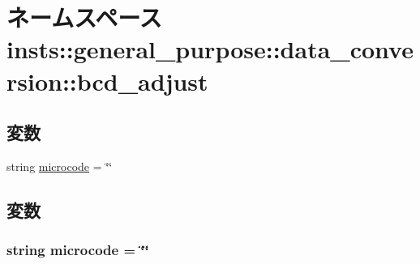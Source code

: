 \hypertarget{namespaceinsts_1_1general__purpose_1_1data__conversion_1_1bcd__adjust}{
\section{ネームスペース insts::general\_\-purpose::data\_\-conversion::bcd\_\-adjust}
\label{namespaceinsts_1_1general__purpose_1_1data__conversion_1_1bcd__adjust}
}
\subsection*{変数}
\begin{DoxyCompactItemize}
\item 
string \hyperlink{namespaceinsts_1_1general__purpose_1_1data__conversion_1_1bcd__adjust_a770f11a173e99389a8802f0107ed8f52}{microcode} = \char`\"{}\char`\"{}
\end{DoxyCompactItemize}


\subsection{変数}
\hypertarget{namespaceinsts_1_1general__purpose_1_1data__conversion_1_1bcd__adjust_a770f11a173e99389a8802f0107ed8f52}{
\subsubsection[{microcode}]{\setlength{\rightskip}{0pt plus 5cm}string {\bf microcode} = \char`\"{}\char`\"{}}}
\label{namespaceinsts_1_1general__purpose_1_1data__conversion_1_1bcd__adjust_a770f11a173e99389a8802f0107ed8f52}
